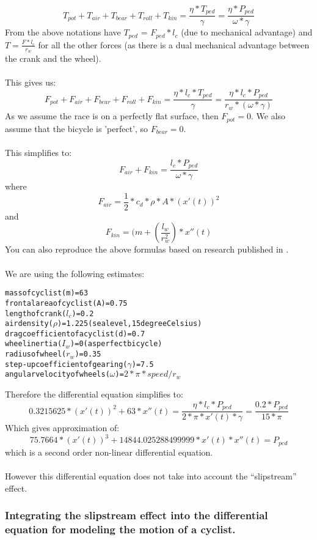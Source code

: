 \documentclass[10pt, a4paper]{report}
\begin{document}
$$ T_{pot} + T_{air} + T_{bear} + T_{roll} + T_{kin} = \frac{ \eta * T_{ped} }{ \gamma }  = \frac{\eta * P_{ped}}{\omega * \gamma} $$
From the above notations have $T_{ped}$ = $F_{ped} * l_{c}$ (due to mechanical advantage) and $T = \frac{F * l_{c}}{r_{w}}$ for all the other forces (as there is a dual mechanical advantage between the crank and the wheel).\\\\
This gives us: $$ F_{pot} + F_{air} + F_{bear} + F_{roll} + F_{kin}
	= \frac{ \eta * l_{c} * T_{ped} }{ \gamma }
	= \frac{ \eta * l_{c} * P_{ped} }{ r_{w} * (\omega * \gamma)} $$
As we assume the race is on a perfectly flat surface, then $F_{pot} = 0$. We also assume that the bicycle is 'perfect', so $F_{bear} = 0$. \\\\
This simplifies to: $$F_{air} + F_{kin} = \frac{l_{c} * P_{ped} }{ \omega * \gamma } $$
where $$ F_{air} 	= \frac{1}{2} * c_{d} * \rho * A * ( x'(t) )^{2} $$
and	  $$ F_{kin} 	= ( m + ( \frac{l_w}{r_w^{2}} ) * x''(t) $$
You can also reproduce the above formulas based on research published in \cite{MathModel}.\\\\
We are using the following estimates:
\begin{alltt}
mass of cyclist (m) 				= 63
frontal area of cyclist (A) 		= 0.75
length of crank (\(l_{c}\)) 		= 0.2
air density (\(\rho\)) 				= 1.225 (sea level, 15 degree Celsius)
drag coefficient of a cyclist (d) 	= 0.7
wheel inertia (\(I_w\)) = 0 (as perfect bicycle)
radius of wheel (\(r_w\)) = 0.35
step-up coefficient of gearing (\(\gamma\)) = 7.5
angular velocity of wheels (\(\omega\)) = \(2 * \pi * speed / {r_{w}} \)
\end{alltt}
Therefore the differential equation simplifies to:
$$ 0.3215625 * (x'(t))^{2} + 63 * x''(t)
	= \frac{\eta * l_{c} * P_{ped}} {2 * \pi * x'(t) * \gamma }
	= \frac {0.2 * P_{ped}} {15 * \pi} $$
Which gives approximation of:
$$ 75.7664 *(x'(t))^{3} + 14844.025288499999 * x'(t) * x''(t) = P_{ped}$$
which is a second order non-linear differential equation.\\\\
However this differential equation does not take into account the ``slipstream'' effect.

\subsubsection{Integrating the slipstream effect into the differential equation for modeling the motion of a cyclist.}
\end{document}
